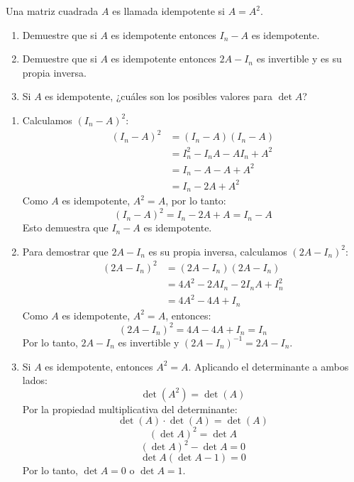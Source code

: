 \begin{prob} Una matriz cuadrada $A$ es llamada idempotente si $A=A^2.$
\begin{enumerate}[$(a)$]
\item Demuestre que si $A$ es idempotente entonces $I_n-A$ es idempotente.
\item Demuestre que si $A$ es idempotente entonces $2A-I_n$ es invertible y es su propia inversa.
\item Si $A$ es idempotente, ¿cuáles son los posibles valores para $\det A$?
\end{enumerate}

\begin{myproof} 
\begin{enumerate}[$(a)$]
\item Calculamos $(I_n-A)^2$:
\begin{align*}
(I_n-A)^2 &= (I_n-A)(I_n-A) \\
&= I_n^2 - I_nA - AI_n + A^2 \\
&= I_n - A - A + A^2 \\
&= I_n - 2A + A^2
\end{align*}
Como $A$ es idempotente, $A^2 = A$, por lo tanto:
$$(I_n-A)^2 = I_n - 2A + A = I_n - A$$
Esto demuestra que $I_n-A$ es idempotente.

\item Para demostrar que $2A-I_n$ es su propia inversa, calculamos $(2A-I_n)^2$:
\begin{align*}
(2A-I_n)^2 &= (2A-I_n)(2A-I_n) \\
&= 4A^2 - 2AI_n - 2I_nA + I_n^2 \\
&= 4A^2 - 4A + I_n
\end{align*}
Como $A$ es idempotente, $A^2 = A$, entonces:
$$(2A-I_n)^2 = 4A - 4A + I_n = I_n$$
Por lo tanto, $2A-I_n$ es invertible y $(2A-I_n)^{-1} = 2A-I_n$.

\item Si $A$ es idempotente, entonces $A^2 = A$. Aplicando el determinante a ambos lados:
$$\det(A^2) = \det(A)$$
Por la propiedad multiplicativa del determinante:
$$\det(A) \cdot \det(A) = \det(A)$$
$$(\det A)^2 = \det A$$
$$(\det A)^2 - \det A = 0$$
$$\det A(\det A - 1) = 0$$
Por lo tanto, $\det A = 0$ o $\det A = 1$.
\end{enumerate}
\end{myproof}
\end{prob}

